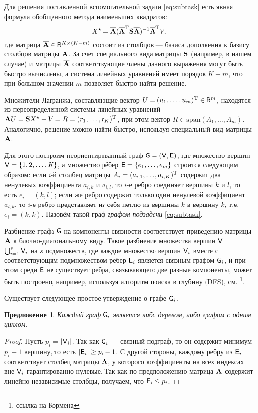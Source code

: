 \documentclass[12pt,a4paper]{article}
\newtheorem{proposition}{Предложение}
\begin{document}
Для решения поставленной вспомогательной задачи \ref{eq:subtask} есть явная формула обобщенного метода наименьших квадратов:
\begin{equation*}
X^\star = \overline {\mathbf{A}} (\overline {\mathbf{A}}^{\mathrm{T}} \mathbf{S} \overline {\mathbf{A}})^{-1} \overline {\mathbf{A}}^{\mathrm{T}} V,
\end{equation*}
где матрица $\overline {\mathbf{A}} \in \mathsf{R}^{K \times (K-m)}$ состоит из столбцов --- базиса дополнения к базису столбцов матрицы $\mathbf{A}$. За счет специального вида матрицы $\mathbf{S}$ (например, в нашем случае) и матрицы $\overline {\mathbf{A}}$ соответствующие члены данного выражения могут быть быстро вычислены, а система линейных уравнений имеет порядок $K-m$, что при большом значении $m$ позволяет быстро найти решение.

Множители Лагранжа, составляющие вектор $U = (u_1, \ldots, u_m)^{\mathrm{T}} \in \mathsf{R}^{m}$, находятся из переопределенной системы линейных уравнений $\mathbf{A} U =  \mathbf{S} X^\star - V = R = (r_1, \ldots, r_K)^{\mathrm{T}}$, при этом вектор $R \in \text{span}(A_1, \ldots, A_m)$. Аналогично, решение можно найти быстро, используя специальный вид матрицы $\mathbf{A}$.

Для этого построим неориентированный граф $\mathsf{G}=(\mathsf{V}, \mathsf{E})$, где множество вершин $\mathsf{V} = \{1, 2, \ldots, K\}$, а множество рёбер $\mathsf{E} = \{e_1, \ldots, e_m\}$ строится следующим образом: если $i$-й столбец матрицы $A_i = (a_{i, 1}, \ldots, a_{i, K})^{\mathrm{T}}$ содержит два ненулевых коэффициента $a_{i,k}$ и $a_{i,l}$, то $i$-е ребро соединяет вершины $k$ и $l$, то есть $e_i = (k, l)$; если же ребро содержит только один ненулевой коэффициент $a_{i,k}$, то $i$-е ребро представляет из себя петлю из вершины $k$ в вершину $k$, т.е. $e_i=(k, k)$. Назовём такой граф \emph{графом подзадачи} \ref{eq:subtask}.

Разбиение графа $\mathsf{G}$ на компоненты связности соответствует приведению матрицы $\mathbf{A}$ к блочно-диагональному виду. Такое разбиение множества вершин $\mathsf{V}$ = $\bigcup_{i=1}^{s} \mathsf{V}_i$ на $s$ подмножеств, где каждое множество вершин $\mathsf{V}_i$ вместе с соответствующим подмножеством ребер $\mathsf{E}_i$ является связным графом $\mathsf{G}_i$, и при этом среди $\mathsf{E}$ не существует ребра, связывающего две разные компоненты, может быть построено, например, используя алгоритм поиска в глубину (DFS), см. \footnote{ссылка на Кормена}.

Существует следующее простое утверждение о графе $\mathsf{G}_i$.
\begin{proposition}
Каждый граф $\mathsf{G}_i$ является либо деревом, либо графом с одним циклом.
\end{proposition}
\begin{proof}
Пусть $p_i$ = $|\mathsf{V}_i|$. Так как $\mathsf{G}_i$ --- связный подграф, то он содержит минимум $p_i - 1$ вершину, то есть $|\mathsf{E}_i| \ge p_i - 1$. С другой стороны, каждому ребру из $\mathsf{E}_i$ соответствует столбец матрицы $\mathbf{A}$, у которого коэффициенты на всех индексах вне $\mathsf{V}_i$ гарантированно нулевые. Так как по предположению матрица $\mathbf{A}$ содержит линейно-независимые столбцы, получаем, что $\mathsf{E}_i \le p_i$.
\end{proof}
\end{document}
